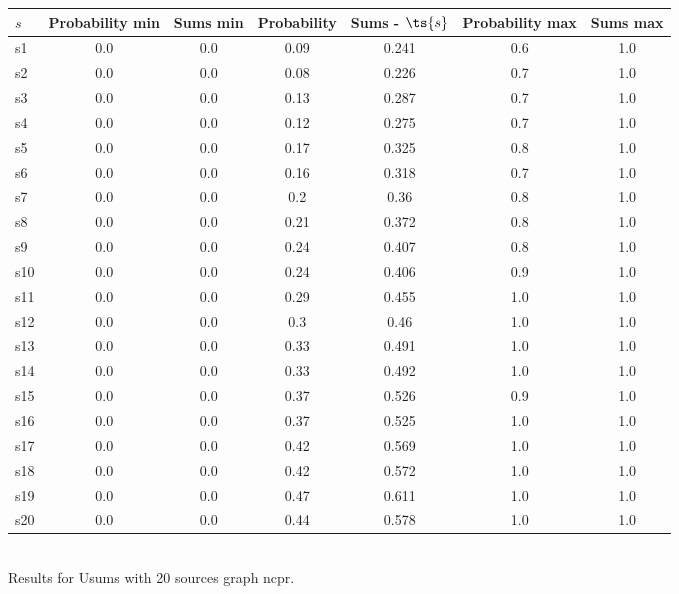 \documentclass{article}
\begin{document}
\noindent\begin{tabular}{|l|c|c|c|c|c|c|}
\hline
$s$& Probability min & Sums min & Probability & Sums - $\ts{s}$ & Probability max & Sums max\\
\hline
s1 &0.0 & 0.0 & 0.09 & 0.241 & 0.6 & 1.0\\
\hline
s2 &0.0 & 0.0 & 0.08 & 0.226 & 0.7 & 1.0\\
\hline
s3 &0.0 & 0.0 & 0.13 & 0.287 & 0.7 & 1.0\\
\hline
s4 &0.0 & 0.0 & 0.12 & 0.275 & 0.7 & 1.0\\
\hline
s5 &0.0 & 0.0 & 0.17 & 0.325 & 0.8 & 1.0\\
\hline
s6 &0.0 & 0.0 & 0.16 & 0.318 & 0.7 & 1.0\\
\hline
s7 &0.0 & 0.0 & 0.2 & 0.36 & 0.8 & 1.0\\
\hline
s8 &0.0 & 0.0 & 0.21 & 0.372 & 0.8 & 1.0\\
\hline
s9 &0.0 & 0.0 & 0.24 & 0.407 & 0.8 & 1.0\\
\hline
s10 &0.0 & 0.0 & 0.24 & 0.406 & 0.9 & 1.0\\
\hline
s11 &0.0 & 0.0 & 0.29 & 0.455 & 1.0 & 1.0\\
\hline
s12 &0.0 & 0.0 & 0.3 & 0.46 & 1.0 & 1.0\\
\hline
s13 &0.0 & 0.0 & 0.33 & 0.491 & 1.0 & 1.0\\
\hline
s14 &0.0 & 0.0 & 0.33 & 0.492 & 1.0 & 1.0\\
\hline
s15 &0.0 & 0.0 & 0.37 & 0.526 & 0.9 & 1.0\\
\hline
s16 &0.0 & 0.0 & 0.37 & 0.525 & 1.0 & 1.0\\
\hline
s17 &0.0 & 0.0 & 0.42 & 0.569 & 1.0 & 1.0\\
\hline
s18 &0.0 & 0.0 & 0.42 & 0.572 & 1.0 & 1.0\\
\hline
s19 &0.0 & 0.0 & 0.47 & 0.611 & 1.0 & 1.0\\
\hline
s20 &0.0 & 0.0 & 0.44 & 0.578 & 1.0 & 1.0\\
\hline
\end{tabular}\\

\noindent Results for Usums with 20 sources graph ncpr.
\end{document}
